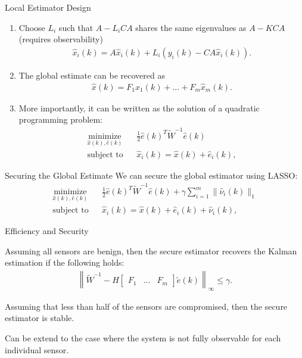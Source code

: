 \documentclass[10pt]{beamer}
\begin{document}
\begin{frame}{Local Estimator Design}
  \begin{enumerate}
  \item  Choose $L_i$ such that $A-L_iCA$ shares the same eigenvalues as $A-KCA$ (requires observability)
    \begin{align*}
      \hat x_i(k) = A \hat x_i(k) + L_i (y_i(k)-CA\hat x_i(k)).
    \end{align*}  
  \item The global estimate can be recovered as
    \begin{align*}
      \hat x(k) = F_1\hat x_1(k)+\dots+F_m\hat x_m(k).
    \end{align*}
  \item More importantly, it can be written as the solution of a quadratic programming problem:
    \begin{align*}
      &\mathop{\textrm{minimize}}\limits_{\hat x(k),\hat e(k)}&
      & \frac{1}{2}\hat e(k)^T \tilde W^{-1} \hat e(k)\\
      &\textrm{subject to} &
      &\hat x_i(k)  =  \hat x(k) + \hat e_i(k),&
    \end{align*}
  \end{enumerate}
\end{frame}

\begin{frame}{Securing the Global Estimate}
  We can secure the global estimator using LASSO:
  \begin{align*}
    &\mathop{\textrm{minimize}}\limits_{\hat x(k),\hat e(k)}&
    & \frac{1}{2}\hat e(k)^T \tilde W^{-1} \hat e(k) + \gamma \sum_{i=1}^m \|\hat \nu_i(k)\|_1\\
    &\textrm{subject to} &
    &\hat x_i(k)  =  \hat x(k) + \hat e_i(k)+\hat \nu_i(k),&
  \end{align*}
\end{frame}

\begin{frame}{Efficiency and Security}
  \begin{theorem}
    Assuming all sensors are benign, then the secure estimator recovers the Kalman estimation if the following holds:
    \begin{align*}
      \left\|\tilde W^{-1} - H \begin{bmatrix}
          F_1&\dots&F_m
        \end{bmatrix}\tilde e(k) \right\|_\infty\leq \gamma.  
    \end{align*}
  \end{theorem}
  \begin{theorem}
    Assuming that less than half of the sensors are compromised, then the secure estimator is stable.
  \end{theorem}
  Can be extend to the case where the system is not fully observable for each individual sensor.
\end{frame}
\end{document}
